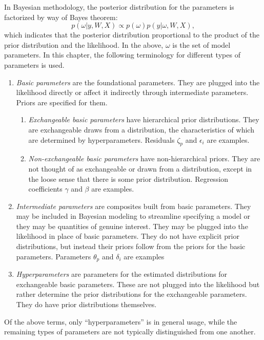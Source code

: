 \documentclass[12pt, letterpaper]{article}
\begin{document}
In Bayesian methodology, the posterior distribution for the parameters is factorized by way of Bayes theorem:
\begin{equation} \label{eq:bayes}
	p(\omega | y, W, X) \propto
	p(\omega)
	p(y | \omega, W, X)
,\end{equation}
which indicates that the posterior distribution proportional to the product of the prior distribution and the likelihood. In the above, $\omega$ is the set of model parameters. In this chapter, the following terminology for different types of parameters is used.
\begin{enumerate}
	\item \emph{Basic parameters}
	are the foundational parameters. They are plugged into the likelihood directly or affect it indirectly through intermediate parameters. Priors are specified for them.
	\begin{enumerate}
		\item \emph{Exchangeable basic parameters}
		have hierarchical prior distributions. They are exchangeable draws from a distribution, the characteristics of which are determined by hyperparameters. Residuals $\zeta_p$ and $\epsilon_i$ are examples.
		\item \emph{Non-exchangeable basic parameters}
		have non-hierarchical priors. They are not thought of as exchangeable or drawn from a distribution, except in the loose sense that there is some prior distribution. Regression coefficients $\gamma$ and $\beta$ are examples.
	\end{enumerate}
	\item \emph{Intermediate parameters}
	are composites built from basic parameters. They may be included in Bayesian modeling to streamline specifying a model or they may be quantities of genuine interest. They may be plugged into the likelihood in place of basic parameters. They do not have explicit prior distributions, but instead their priors follow from the priors for the basic parameters. Parameters $\theta_p$ and $\delta_i$ are examples
	\item \emph{Hyperparameters}
	are parameters for the estimated distributions for exchangeable basic parameters. These are not plugged into the likelihood but rather determine the prior distributions for the exchangeable parameters. They do have prior distributions themselves.
\end{enumerate}
Of the above terms, only ``hyperparameters'' is in general usage, while the remaining types of parameters are not typically distinguished from one another.
\end{document}
